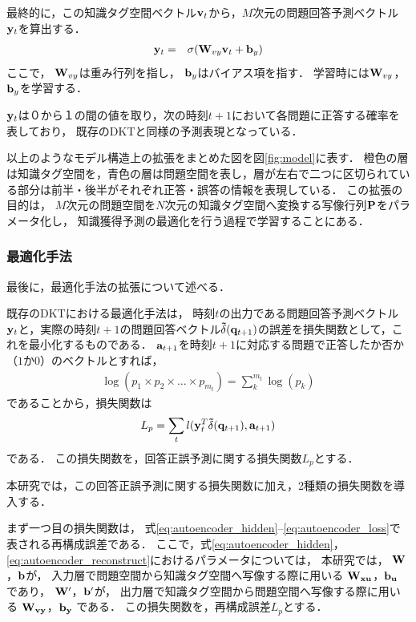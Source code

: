 最終的に，この知識タグ空間ベクトル${\bf v}_t$から，$M$次元の問題回答予測ベクトル${\bf y}_t$を算出する．
\begin{eqnarray}
{\bf y}_t &=& \sigma( {\bf W}_{vy} {\bf v}_t + {\bf b}_y)
\end{eqnarray}
ここで，
${\bf W}_{vy}$は重み行列を指し，
${\bf b}_y$はバイアス項を指す．
学習時には${\bf W}_{vy}$，${\bf b}_y$を学習する．

${\bf y}_t$は０から１の間の値を取り，次の時刻$t+1$において各問題に正答する確率を表しており，
既存のDKTと同様の予測表現となっている．


以上のようなモデル構造上の拡張をまとめた図を図\ref{fig:model}に表す．
橙色の層は知識タグ空間を，青色の層は問題空間を表し，層が左右で二つに区切られている部分は前半・後半がそれぞれ正答・誤答の情報を表現している．
この拡張の目的は，
$M$次元の問題空間を$N$次元の知識タグ空間へ変換する写像行列${\bf P}$をパラメータ化し，
知識獲得予測の最適化を行う過程で学習することにある．



\subsubsection{最適化手法}
最後に，最適化手法の拡張について述べる．

既存のDKTにおける最適化手法は，
時刻$t$の出力である問題回答予測ベクトル${\bf y}_t$と，実際の時刻$t+1$の問題回答ベクトル${\bf\tilde{ \delta}}({\bf q}_{t+1})$の誤差を損失関数として，これを最小化するものである．
${\bf a}_{t+1}$を時刻$t+1$に対応する問題で正答したか否か（$1$か$0$）のベクトルとすれば，
\begin{eqnarray}
\label{eq:log_sum}
{\log(p_1 \times p_2 \times \dots \times p_{m_t}) = \sum_{k}^{m_t} \log(p_k)}
\end{eqnarray}
であることから，損失関数は
\begin{eqnarray}
\label{eq:prediction_entropy}
{L_p = \sum_t l({\bf y}_t^T {\bf \tilde{\delta}}({\bf q}_{t+1}), {\bf a}_{t+1})}
\end{eqnarray}
である．
この損失関数を，回答正誤予測に関する損失関数$L_p$とする．


本研究では，この回答正誤予測に関する損失関数に加え，2種類の損失関数を導入する．

まず一つ目の損失関数は，
式\ref{eq:autoencoder_hidden}--\ref{eq:autoencoder_loss}で表される再構成誤差である．
ここで，式\ref{eq:autoencoder_hidden}，\ref{eq:autoencoder_reconstruct}におけるパラメータについては，
本研究では，
${\bf W}$，${\bf b}$が，
入力層で問題空間から知識タグ空間へ写像する際に用いる
${\bf W_{xu}}$，${\bf b_u}$
であり，
${\bf W'}$，${\bf b'}$が，
出力層で知識タグ空間から問題空間へ写像する際に用いる
${\bf W_{vy}}$，${\bf b_y}$
である．
この損失関数を，再構成誤差$L_p$とする．

